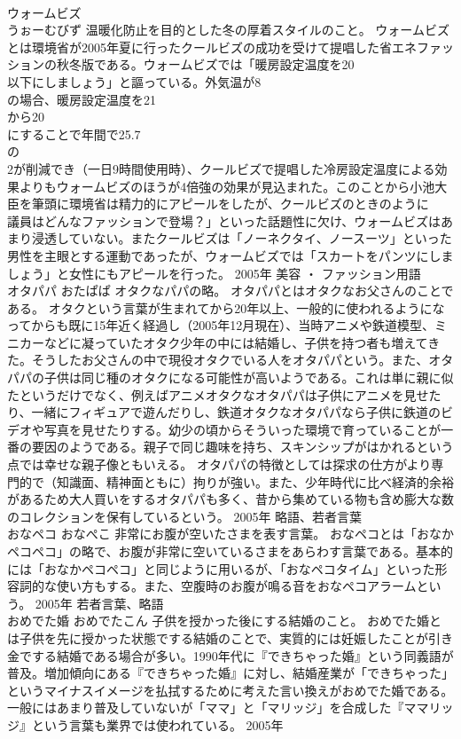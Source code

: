 \documentclass[8pt]{extreport}
\begin{document}
\begin{CJK}{UTF8}{min}
\\	ウォームビズ 
\\	うぉーむびず	温暖化防止を目的とした冬の厚着スタイルのこと。	ウォームビズとは環境省が2005年夏に行ったクールビズの成功を受けて提唱した省エネファッションの秋冬版である。ウォームビズでは「暖房設定温度を20
\\	以下にしましょう」と謳っている。外気温が8
\\	の場合、暖房設定温度を21
\\	から20
\\	にすることで年間で25.7
\\	の
\\	2が削減でき（一日9時間使用時）、クールビズで提唱した冷房設定温度による効果よりもウォームビズのほうが4倍強の効果が見込まれた。このことから小池大臣を筆頭に環境省は精力的にアピールをしたが、クールビズのときのように
\\	議員はどんなファッションで登場？」といった話題性に欠け、ウォームビズはあまり浸透していない。またクールビズは「ノーネクタイ、ノースーツ」といった男性を主眼とする運動であったが、ウォームビズでは「スカートをパンツにしましょう」と女性にもアピールを行った。	2005年	美容 ・ ファッション用語	
\\	オタパパ	おたぱぱ	オタクなパパの略。	オタパパとはオタクなお父さんのことである。 オタクという言葉が生まれてから20年以上、一般的に使われるようになってからも既に15年近く経過し（2005年12月現在）、当時アニメや鉄道模型、ミニカーなどに凝っていたオタク少年の中には結婚し、子供を持つ者も増えてきた。そうしたお父さんの中で現役オタクでいる人をオタパパという。また、オタパパの子供は同じ種のオタクになる可能性が高いようである。これは単に親に似たというだけでなく、例えばアニメオタクなオタパパは子供にアニメを見せたり、一緒にフィギュアで遊んだりし、鉄道オタクなオタパパなら子供に鉄道のビデオや写真を見せたりする。幼少の頃からそういった環境で育っていることが一番の要因のようである。親子で同じ趣味を持ち、スキンシップがはかれるという点では幸せな親子像ともいえる。 オタパパの特徴としては探求の仕方がより専門的で（知識面、精神面ともに）拘りが強い。また、少年時代に比べ経済的余裕があるため大人買いをするオタパパも多く、昔から集めている物も含め膨大な数のコレクションを保有しているという。	2005年	略語、若者言葉	
\\	おなペコ	おなぺこ	非常にお腹が空いたさまを表す言葉。	おなペコとは「おなかペコペコ」の略で、お腹が非常に空いているさまをあらわす言葉である。基本的には「おなかペコペコ」と同じように用いるが、「おなペコタイム」といった形容詞的な使い方もする。また、空腹時のお腹が鳴る音をおなペコアラームという。	2005年	若者言葉、略語	
\\	おめでた婚	おめでたこん	子供を授かった後にする結婚のこと。	おめでた婚とは子供を先に授かった状態でする結婚のことで、実質的には妊娠したことが引き金でする結婚である場合が多い。1990年代に『できちゃった婚』という同義語が普及。増加傾向にある『できちゃった婚』に対し、結婚産業が「できちゃった」というマイナスイメージを払拭するために考えた言い換えがおめでた婚である。一般にはあまり普及していないが「ママ」と「マリッジ」を合成した『ママリッジ』という言葉も業界では使われている。	2005年	

\end{CJK}
\end{document}
